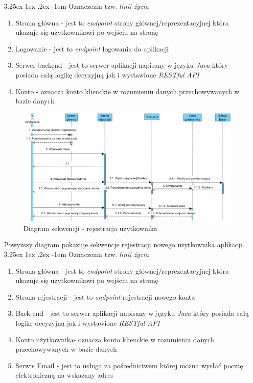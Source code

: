 \documentclass[10pt,titlepage]{article} %
\makeatletter
\renewcommand{\normalsize}{\fontsize{8pt}{10pt}\selectfont} %
\renewcommand\paragraph{\@startsection{paragraph}{5}{\z@}%
  {3.25ex \@plus1ex \@minus.2ex}%
  {-1em}%
  {\normalfont\normalsize\bfseries}}
\makeatother
\begin{document}
\paragraph{Oznaczenia tzw. \textit{linii życia}}
\begin{enumerate}[1.]
\item Strona główna - jest to \textit{endpoint} strony głównej/reprezentacyjnej która ukazuje się użytkownikowi po wejściu na stronę
\item Logowanie - jest to \textit{endpoint} logowania do aplikacji
\item Serwer backend - jest to serwer aplikacji napisany w języku \textit{Java} który posiada całą logikę decyzyjną jak i wystawione \textit{RESTful API}
\item Konto - oznacza konto klienckie w rozumieniu danych przechowywanych w bazie danych
\end{enumerate}

\begin{figure}[H]
\includegraphics[width=\textwidth]{img/sekcja2/rejestracjaSD}
\caption[Diagram sekwencji - rejestracja użytkownika]{Diagram sekwencji - rejestracja użytkownika}
\end{figure}
Powyższy diagram pokazuje sekwencje rejestracji nowego użytkownika aplikacji.
\paragraph{Oznaczenia tzw. \textit{linii życia}}
\begin{enumerate}[1.]
\item Strona główna - jest to \textit{endpoint} strony głównej/reprezentacyjnej która ukazuje się użytkownikowi po wejściu na stronę
\item Strona rejestracji - jest to \textit{endpoint} rejestracji nowego konta
\item Back-end - jest to serwer aplikacji napisany w języku \textit{Java} który posiada całą logikę decyzyjną jak i wystawione \textit{RESTful API}
\item Konto użytkownika- oznacza konto klienckie w rozumieniu danych przechowywanych w bazie danych
\item Serwis Email - jest to usługa za pośrednictwem której można wysłać pocztę elektroniczną na wskazany adres
\end{enumerate}
\end{document}
